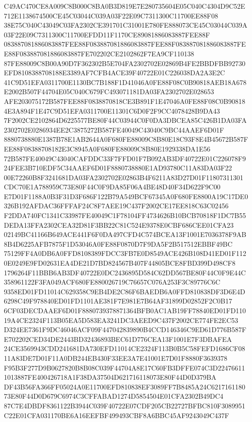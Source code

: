 \documentclass[UTF8,fontset=fandol,zihao=-4,a4paper]{ctexart}
\begin{document}
{{C49AC470CE8A009C8B000C8BA0B3D819E7E280735604E05C040C4304D9C52E712E1138674500CE45C03044C039A03F22E09C7311300C11700EE88F08
38E75C040C43049C03FA2302CE391701C31001E780FE888073CE45C03044C039A03F22E09C7311300C11700EFDD11F1170CE89081886083887FEE88F
083887081886083887FEE88F083887081886083887FEE88F083887081886083887FEE88F083887081886083887FE702202CE2102862F7EA9CF110138
87FE88009C8B00A90D7F362302B5E704FA2302702E02869B4FE2BBDFBB92730EFD8108388708188E3389AF7CFB4ACE39F40722E01C226038DA2A3E2C
41C9D51EFA0311700E1130BC7B188F1D41046A0FE88F08C0B90818AEB18A678E2002B507F44704E05C040C679FC493071181DA03FA2302702E028653
AFE203075172B587FEE88F0838870818CE3B891F1E47046A0FE88F08C0B908184E3A894F1E47C9D51EFA0311700E11301C6D0F2F9CC4078428B9DA43
7F2002CE2102864D6225577BE80F44C03944C0F0DA3DBCEA85C426B1DA03FA2302702E0286934EE2C3875272B587FE40049C43040C9BC44AAEF6D01F
8880738880E1387B78E1AB2644A0F680FE88009C8B80E18C93F8E4B45672B587FEE88F08388708182E3C8945A0F680FE88009C8B80E1929338DA1E56
72B587FE40049C43040CAFDDC33F7FFD01F7B092AB3DF40722E01C226078F924FEE3B710EDF5C34AAEF6D01F8880738880E1AD93780C11A83DA03F22
00E72260B8F3241681DA03FA2302702E02863B4F6211A83D27D01F11807311301CDC70E1A788959C73E80F44C0F9DA85F06A4BE48D40F34D622F9C00
E7D01F1188A0B3F31D3F686F122B79A549BCF67345A0F680FE8800A19C17DE0326B192AFDAC36FFFAF24C8F7AEE19C437F2002CE17EE818C63C02456
F2DDA740FC1341C33987FE40049C1F78104FF4734626B10BCB70818F1DC7B55DEDA13FFA2302CEA32D81F3BB22C81C524E9378E0CBF686CEE01CFA23
02149BC41166B649ACE441F6F0DA497CFD4C574BCEA13F1001E7036378F9AB8B4D6225AFB7875F1D53046A0FE88F0870D7F9DA5F2B517512EBBF49BC
75129FF4A0DB6A0FFD8108389FDCC3FB7E0D8549ACE426B108D41ED01F1120E0249E9FD02631EA4DE21D7BD824567B407F44805BCE8FBD399D498CF8
1796264F11BBB6AB3DF40722E0DC2436895D584C62DD567BE80F44C0F9E44C358961122F3FA049ACF680FE880026719C76657C076A253F3C89776C6C
9358ED01FD11014C629358C9EB4DE2C86F6BAEDB6A0FFD810838DF3D6E4D6298C49F978840ED01FD1101AE381F7E981E7B64AF31899D02852F2C0B17
6CF03DECDAAEF6D01F8880739378871364BFB0AC1AB19FF78840ED01FD11019A4CE2324F113B05EA5D583EA3241DC3AEED9C437F2002CE774FE2EC53
D324EE7361F9DC46046ACF09F447042839890B4CCD146346C9ED61D776B587FE702202CED34DE2443BD32436893BEC61D776CEA13F1001E7F3DBAFEA
24CE3569943CDD241681DA730EFD11014CE2324F113B0B5C58FEFD1686CF0811A83DE7D01F11A0DB244EB430F33EE3A7E41001E7D01F8880F3639378
F95B3F277D9B0627820B8B08C039F44704A8E17C60FB3DFFE074C3D224766111013887FE400426718A1F38DA37504D621716118073E80F44D0D379BA
DF43B56FA366FF05024A0E11700EFD810838EF3089FF7B8485A24C621716118073E80F44D0D679C6974C3CFFABAD1274D5854504E01CFA2302B49DC4
87C7E4DBDF8361122B3944C039F40722E07CDF205CB22727BFBC810F3089951C22E01CFA031170BE6A16EEFBF499493CBF8A6BBC45AF9243049C437F
}}
\end{document}
